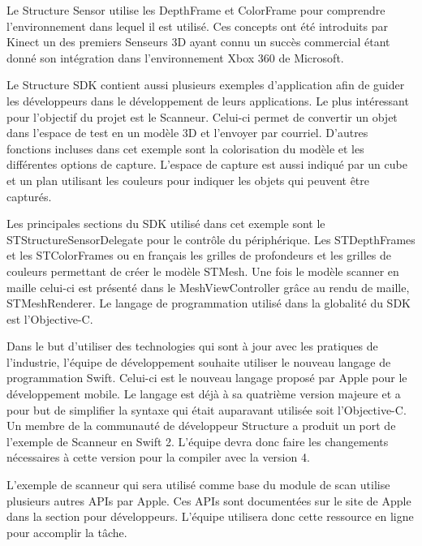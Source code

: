 \documentclass[rapport.tex]{subfiles}
\begin{document}
\par
Le Structure Sensor utilise les DepthFrame et ColorFrame pour comprendre l’environnement dans lequel il est utilisé. Ces concepts ont été introduits par Kinect un des premiers Senseurs 3D ayant connu un succès commercial étant donné son intégration dans l’environnement Xbox 360 de Microsoft. \citep*{microsoft01} 
\par
Le Structure SDK contient aussi plusieurs exemples d’application afin de guider les développeurs dans le développement de leurs applications. Le plus intéressant pour l’objectif du projet est le Scanneur. Celui-ci permet de convertir un objet dans l’espace de test en un modèle 3D et l’envoyer par courriel. D’autres fonctions incluses dans cet exemple sont la colorisation du modèle et les différentes options de capture. L’espace de capture est aussi indiqué par un cube et un plan utilisant les couleurs pour indiquer les objets qui peuvent être capturés.
\par
Les principales sections du SDK utilisé dans cet exemple sont le STStructureSensorDelegate pour le contrôle du périphérique. Les STDepthFrames et les STColorFrames ou en français les grilles de profondeurs et les grilles de couleurs permettant de créer le modèle STMesh. Une fois le modèle scanner en maille celui-ci est présenté dans le MeshViewController grâce au rendu de maille, STMeshRenderer. Le langage de programmation utilisé dans la globalité du SDK est l’Objective-C.
\par
Dans le but d’utiliser des technologies qui sont à jour avec les pratiques de l’industrie, l’équipe de développement souhaite utiliser le nouveau langage de programmation Swift. Celui-ci est le nouveau langage proposé par Apple pour le développement mobile. Le langage est déjà à sa quatrième version majeure et a pour but de simplifier la syntaxe qui était auparavant utilisée soit l’Objective-C.\citep*{swift01} Un membre de la communauté de développeur Structure a produit un port de l’exemple de Scanneur en Swift 2. L’équipe devra donc faire les changements nécessaires à cette version pour la compiler avec la version 4.\citep*{structureScannerSwift} 
\par
L’exemple de scanneur qui sera utilisé comme base du module de scan utilise plusieurs autres APIs par Apple. Ces APIs sont documentées sur le site de Apple dans la section pour développeurs. \citep{appleDev} L’équipe utilisera donc cette ressource en ligne pour accomplir la tâche.
\end{document}
